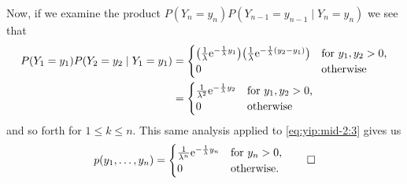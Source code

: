 \begin{solution*}
  Now, if we examine the product \(P(Y_n=y_n)P(Y_{n-1}=y_{n-1}\mid
  Y_n=y_n)\) we see that
  \[
    \begin{aligned}
      P(Y_1=y_1)P(Y_2=y_2\mid Y_1=y_1)&=%
      \begin{cases}
        \bigl(\frac{1}{\lambda}\rme^{-\frac{1}{\lambda}y_1}\bigr)%
        \bigl(\frac{1}{\lambda}\rme^{-\frac{1}{\lambda}(y_2-y_1)}\bigr)
        &\text{for \(y_1,y_2>0\),}\\
        0&\text{otherwise}
      \end{cases}\\
      &=\begin{cases}
        \frac{1}{\lambda^2}\rme^{-\frac{1}{\lambda}y_2}
        &\text{for \(y_1,y_2>0\),}\\
        0&\text{otherwise}
    \end{cases}
  \end{aligned}
  \]
  and so forth for \(1\leq k\leq n\). This same analysis applied to
  \eqref{eq:yip:mid-2:3} gives us
  \[
    p(y_1,\dotsc,y_n)=
    \begin{cases}
      \frac{1}{\lambda^n}\mathrm{e}^{-\frac{1}{\lambda}y_n}&\text{for \(y_n>0\),}\\
      0&\text{otherwise.}
    \end{cases}\qedhere
  \]
\end{solution*}


